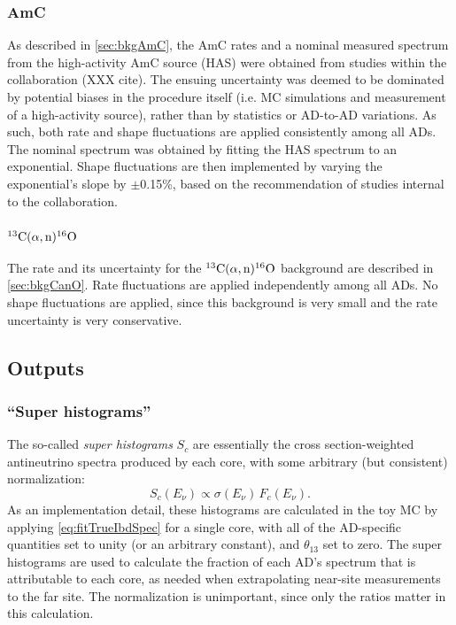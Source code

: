 \documentclass[../thesis.tex]{subfiles}
\begin{document}
\subsubsection{AmC}

As described in \autoref{sec:bkgAmC}, the AmC rates and a nominal measured spectrum from the high-activity AmC source (HAS) were obtained from studies within the collaboration (XXX cite). The ensuing uncertainty was deemed to be dominated by potential biases in the procedure itself (i.e. MC simulations and measurement of a high-activity source), rather than by statistics or AD-to-AD variations. As such, both rate and shape fluctuations are applied consistently among all ADs. The nominal spectrum was obtained by fitting the HAS spectrum to an exponential. Shape fluctuations are then implemented by varying the exponential's slope by $\pm$0.15\%, based on the recommendation of studies internal to the collaboration.

\subsubsection{$^{13}\mathrm{C}(\alpha, \mathrm{n})^{16}\mathrm{O}$}

The rate and its uncertainty for the $^{13}\mathrm{C}(\alpha, \mathrm{n})^{16}\mathrm{O}$ background are described in \autoref{sec:bkgCanO}. Rate fluctuations are applied independently among all ADs. No shape fluctuations are applied, since this background is very small and the rate uncertainty is very conservative.

\subsection{Outputs}
\label{sec:fitToyOutputs}

\subsubsection{``Super histograms''}

The so-called \emph{super histograms} $S_c$ are essentially the cross section-weighted antineutrino spectra produced by each core, with some arbitrary (but consistent) normalization:
\begin{equation*}
  S_c(E_\nu) \propto \sigma(E_\nu)\,F_c(E_\nu).
\end{equation*}
As an implementation detail, these histograms are calculated in the toy MC by applying \autoref{eq:fitTrueIbdSpec} for a single core, with all of the AD-specific quantities set to unity (or an arbitrary constant), and $\theta_{13}$ set to zero. The super histograms are used to calculate the fraction of each AD's spectrum that is attributable to each core, as needed when extrapolating near-site measurements to the far site. The normalization is unimportant, since only the ratios matter in this calculation.
\end{document}
